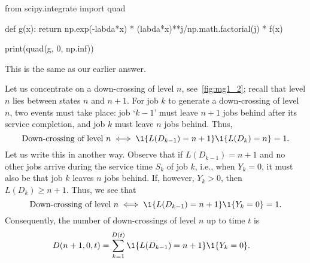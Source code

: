 \begin{exercise}
\begin{solution}
\begin{pyconsole}
from scipy.integrate import quad

def g(x):
 return np.exp(-labda*x) * (labda*x)**j/np.math.factorial(j) * f(x)

print(quad(g, 0, np.inf))
\end{pyconsole}

This is the same as our earlier answer.
\end{solution}
\end{exercise}


Let us concentrate on a down-crossing of level $n$, see~\cref{fig:mg1_2}; recall that level $n$ lies between states $n$ and $n+1$.
For job $k$ to generate a down-crossing of level $n$, two events must take place: job `$k-1$' must leave $n+1$ jobs behind after its service completion, and job $k$ must leave $n$ jobs behind.
Thus,
 \begin{equation*}
 \text{Down-crossing of level $n$} \iff \1{L(D_{k-1}) = n+1}\1{L(D_k)=n} = 1.
 \end{equation*}
Let us write this in another
way. Observe that if $L(D_{k-1})=n+1$ and no other jobs arrive during
the service time $S_k$ of job $k$, i.e., when $Y_k=0$, it must also be
that job $k$ leaves $n$ jobs behind. If, however, $Y_k>0$, then
$L(D_k)\geq n+1$. Thus, we see that
 \begin{equation*}
 \text{Down-crossing of level $n$} \iff \1{L(D_{k-1}) = n+1}\1{Y_k=0} = 1.
 \end{equation*}
Consequently, the number of down-crossings of level $n$ up to time $t$ is
\begin{equation*}
 \begin{split}
 D(n+1, 0, t) 
&= \sum_{k=1}^{D(t)}\1{L(D_{k-1})=n+1}\1{Y_k=0}.
 \end{split}
\end{equation*}

